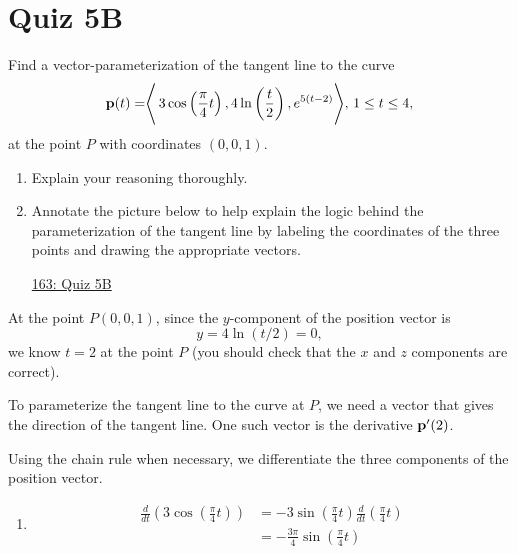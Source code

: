 \documentclass{ximera}
\begin{document}
\section{Quiz 5B}

\begin{question} \label{Qkfdser}

Find a vector-parameterization of the tangent line to the curve
\[
   {\bf p}(t) = \Biggr \langle  \, 3\cos\left( \frac{\pi}{4}t \right), 4 \ln \left(\frac{t}{2} \right) , e^{5(t-2)} \Biggr \rangle , \, 1\leq t \leq 4 ,
\] 
at the point $P$ with coordinates $(0,0,1)$.

\begin{enumerate}
\item Explain your reasoning thoroughly.

\item Annotate the picture below to help explain the logic behind the parameterization of the tangent line by labeling the coordinates of the three points and drawing the appropriate vectors.

\begin{onlineOnly}
    \begin{center}
\end{center}
\end{onlineOnly}

\href{https://www.desmos.com/3d/gycfdbogol}{163: Quiz 5B}

\end{enumerate}

\begin{explanation}
At the point $P(0,0,1)$, since the $y$-component of the position vector is 
\[
     y = 4\ln (t/2) = 0,
\]
we know $t=2$ at the point $P$ (you should check that the $x$ and $z$ components are correct).

To parameterize the tangent line to the curve at $P$, we need a vector that gives the direction of the tangent line. One such vector is the derivative ${\bf p}^\prime(2)$. 

Using the chain rule when necessary, we differentiate the three components of the position vector.

\begin{enumerate}
\item
\begin{align*}
    \frac{d}{dt}\left( 3\cos\left( \frac{\pi}{4}t \right) \right)  &= -3 \sin  \left( \frac{\pi}{4}t \right) \frac{d}{dt}\left(  \frac{\pi}{4}t \right) \\
        &= -\frac{3\pi}{4} \sin  \left( \frac{\pi}{4}t \right)
\end{align*}


\end{enumerate}
\end{explanation}
\end{question}
\end{document}
